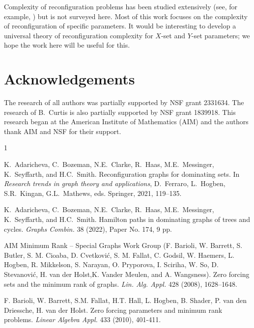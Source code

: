 \documentclass{article}
\numberwithin{figure}{section}
\numberwithin{table}{section}
\numberwithin{equation}{section}
\theoremstyle{definition}
\theoremstyle{definition}
\theoremstyle{definition}
\begin{document}
{Complexity of reconfiguration problems has been studied extensively  (see, for example, \cite{IDHPSUU11, KMM12, MS20, Nish18})  but is not surveyed here. Most of this work focuses on the complexity of reconfiguration of specific parameters.  It would be interesting to develop a universal theory of reconfiguration complexity for $X$-set and $Y$-set parameters; we hope the work here will be useful for this.


\section*{Acknowledgements}

The research of all authors was partially supported by NSF grant  2331634.  The research of B.~Curtis  is also partially supported by NSF grant  1839918. This research began at the American Institute of Mathematics (AIM) and the authors thank AIM and NSF for their support.

\begin{thebibliography}{1}


K.~Adaricheva, C.~Bozeman, N.E.~Clarke, R.~Haas, M.E.~Messinger, K.~Seyffarth, and H.C.~Smith. Reconfiguration graphs for dominating sets.  In \emph{Research trends in graph theory and applications}, D.~Ferraro, L.~Hogben, S.R.~Kingan, G.L.~Mathews, eds.
Springer,  2021, 119--135.

K.~Adaricheva, C.~Bozeman, N.E.~Clarke, R.~Haas, M.E.~Messinger, K.~Seyffarth, and H.C.~Smith. Hamilton paths in dominating graphs of trees and cycles.
\emph{Graphs Combin.} 38 (2022), Paper No. 174, 9 pp. 

 AIM Minimum Rank -- Special Graphs Work Group (F. Barioli, W. Barrett, S. Butler,   S. M. Cioaba, D. Cvetkovi\'c,  S. M. Fallat, C. Godsil,  W. Haemers,  L. Hogben,  R. Mikkelson,  S. Narayan,  O. Pryporova,   I. Sciriha,  W. So,   D. Stevanovi\'c,  H. van der Holst,K. Vander Meulen, and A. Wangsness).  Zero forcing sets and the minimum rank  of graphs.   {\em Lin. Alg. Appl.} 428 (2008), 1628--1648.


 F. Barioli, W. Barrett, S.M. Fallat, H.T. Hall, L. Hogben, B. Shader, P. van den Driessche, H. van der Holst.  Zero forcing parameters and minimum rank problems. {\it{Linear Algebra Appl.}} {433} (2010), 401-411.



\end{thebibliography}}
\end{document}
